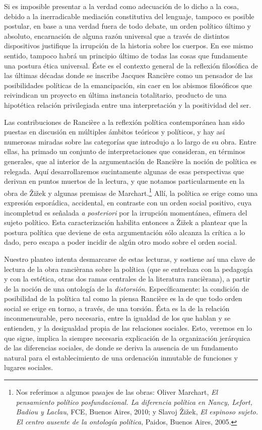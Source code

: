 Si es imposible presentar a la verdad como adecuación de lo dicho a la cosa, debido a la inerradicable mediación constitutiva del lenguaje, tampoco es posible postular, en base a una verdad fuera de todo debate, un orden político último y absoluto, encarnación de alguna razón universal que a través de distintos dispositivos justifique la irrupción de la historia sobre los cuerpos. En ese mismo sentido, tampoco habrá un principio último de todas las cosas que fundamente una postura ética universal. Éste es el contexto general de la reflexión filosófica de las últimas décadas donde se inscribe Jacques Rancière como un pensador de las posibilidades políticas de la emancipación, sin caer en los abismos filosóficos que reivindican un proyecto en última instancia totalitario, producto de una hipotética relación privilegiada entre una interpretación y la positividad del ser.

Las contribuciones de Rancière a la reflexión política contemporánea han sido puestas en discusión en múltiples ámbitos teóricos y políticos, y hay así numerosas miradas sobre las categorías que introdujo a lo largo de su obra. Entre ellas, ha primado un conjunto de interpretaciones que consideran, en términos generales, que al interior de la argumentación de Rancière la noción de política es relegada. Aquí desarrollaremos sucintamente algunas de esas perspectivas que derivan en puntos muertos de la lectura, y que notamos particularmente en la obra de Žižek y algunas premisas de Marchart.\footnote{Nos referimos a algunos pasajes de las obras: Oliver Marchart, \emph{El pensamiento político posfundacional. La diferencia política en Nancy, Lefort, Badiou y Laclau}, FCE, Buenos Aires, 2010; y Slavoj Žižek, \emph{El espinoso sujeto. El centro ausente de la ontología política}, Paidos, Buenos Aires, 2005.} Allí, la política se erige como una expresión esporádica, accidental, en contraste con un orden social positivo, cuya incompletud es señalada \emph{a posteriori} por la irrupción momentánea, efímera del sujeto político. Esta caracterización habilita entonces a Žižek a plantear que la postura política que deviene de esta argumentación sólo alcanza la crítica a lo dado, pero escapa a poder incidir de algún otro modo sobre el orden social.

Nuestro planteo intenta desmarcarse de estas lecturas, y sostiene así una clave de lectura de la obra rancièrana sobre la política (que se entrelaza con la pedagogía y con la estética, otras dos ramas centrales de la literatura rancièrana), a partir de la noción de una ontología de la \emph{distorsión}. Específicamente: la condición de posibilidad de la política tal como la piensa Rancière es la de que todo orden social se erige en torno, a través, de una torsión. Ésta es la de la relación inconmensurable, pero necesaria, entre la igualdad de los que hablan y se entienden, y la desigualdad propia de las relaciones sociales. Esto, veremos en lo que sigue, implica la siempre necesaria explicación de la organización jerárquica de las diferencias sociales, de donde se deriva la ausencia de un fundamento natural para el establecimiento de una ordenación inmutable de funciones y lugares sociales.


